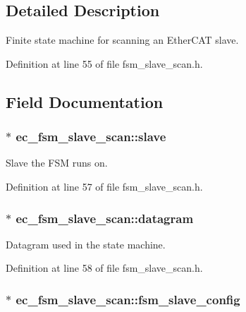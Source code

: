 \subsection{Detailed Description}
Finite state machine for scanning an Ether\-C\-A\-T slave. 

Definition at line 55 of file fsm\-\_\-slave\-\_\-scan.\-h.



\subsection{Field Documentation}
\subsubsection[{slave}]{$\ast$ ec\-\_\-fsm\-\_\-slave\-\_\-scan\-::slave}\label{structec__fsm__slave__scan_a54c987af1db08e3a333d98f76d71de15}


Slave the F\-S\-M runs on. 



Definition at line 57 of file fsm\-\_\-slave\-\_\-scan.\-h.

\subsubsection[{datagram}]{$\ast$ ec\-\_\-fsm\-\_\-slave\-\_\-scan\-::datagram}\label{structec__fsm__slave__scan_a93ae94f618186affb1530667745ba774}


Datagram used in the state machine. 



Definition at line 58 of file fsm\-\_\-slave\-\_\-scan.\-h.

\subsubsection[{fsm\-\_\-slave\-\_\-config}]{$\ast$ ec\-\_\-fsm\-\_\-slave\-\_\-scan\-::fsm\-\_\-slave\-\_\-config}\label{structec__fsm__slave__scan_a39373f1c4e973c777cd3e27e040b8f66}


